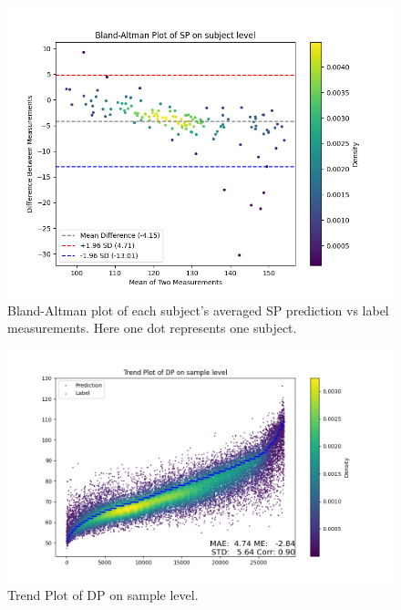 \documentclass{article}
\begin{document}
\begin{figure}[H]
\centering
\includegraphics[width=\textwidth]{./Fig/Bland_Altman_Plot_SP_on_subject_level.png}
\caption{Bland-Altman plot of each subject's averaged SP prediction vs label measurements. Here one dot represents one subject.}
\label{fig:image1}
\end{figure}

\begin{figure}[H]
\centering
\includegraphics[width=\textwidth]{./Fig/Trend_Plot_DP_on_sample_level.png}
\caption{Trend Plot of DP on sample level.}
\label{fig:image1}
\end{figure}
\end{document}
